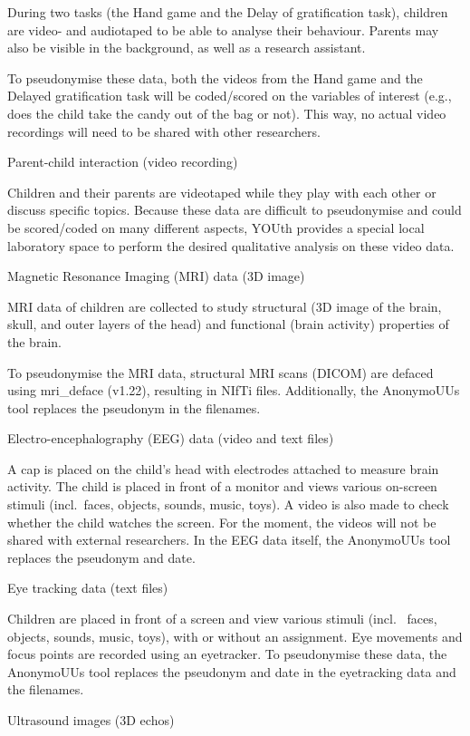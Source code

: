 \documentclass[
]{book}
\begin{document}
During two tasks (the Hand game and the Delay of gratification task),
children are video- and audiotaped to be able to analyse their behaviour. Parents
may also be visible in the background, as well as a research assistant.

To pseudonymise these data, both the videos from the Hand game and the Delayed
gratification task will be coded/scored on the variables of interest (e.g., does
the child take the candy out of the bag or not). This way, no actual video
recordings will need to be shared with other researchers.

Parent-child interaction (video recording)

Children and their parents are videotaped while they play with each other
or discuss specific topics. Because these data are difficult to pseudonymise and
could be scored/coded on many different aspects, YOUth provides a special local
laboratory space to perform the desired qualitative analysis on these video
data.

Magnetic Resonance Imaging (MRI) data (3D image)

MRI data of children are collected to study structural (3D image of the
brain, skull, and outer layers of the head) and functional (brain activity)
properties of the brain.

To pseudonymise the MRI data, structural MRI scans (DICOM) are defaced using
mri\_deface
(v1.22), resulting in NIfTi files. Additionally, the AnonymoUUs tool replaces
the pseudonym in the filenames.

Electro-encephalography (EEG) data (video and text files)

A cap is placed on the child's head with electrodes attached to measure
brain activity. The child is placed in front of a monitor and views various
on-screen stimuli (incl.~faces, objects, sounds, music, toys). A video is also
made to check whether the child watches the screen. For the moment, the videos
will not be shared with external researchers. In the EEG data itself, the
AnonymoUUs tool replaces the pseudonym and date.

Eye tracking data (text files)

Children are placed in front of a screen and view various stimuli (incl.~
faces, objects, sounds, music, toys), with or without an assignment. Eye
movements and focus points are recorded using an eyetracker. To pseudonymise
these data, the AnonymoUUs tool replaces the pseudonym and date in the
eyetracking data and the filenames.

Ultrasound images (3D echos)
\end{document}
